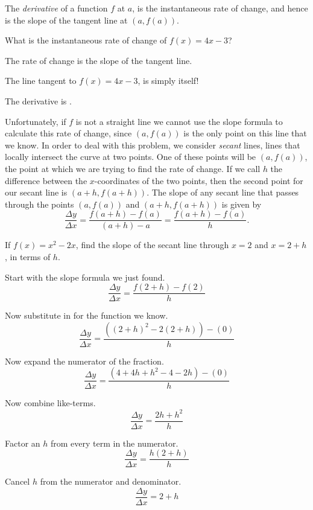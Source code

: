 \documentclass{ximera}
\begin{document}
The \textit{derivative} of a function $f$ at $a$, is the instantaneous
rate of change, and hence is the slope of the tangent line at $(a,f(a))$. 

\begin{question}
	What is the instantaneous rate of change of $f(x) = 4x-3$?
	\begin{hint}
		The rate of change is the slope of the tangent line.
	\end{hint}
	\begin{hint}
		The line tangent to $f(x) = 4x-3$, is simply itself!
	\end{hint}
	\begin{prompt}
		The derivative is .
	\end{prompt}
\end{question}


Unfortunately, if $f$ is not a straight line we cannot use the slope formula to calculate this rate of change, since
$(a,f(a))$ is the only point on this line that we know.  In order to deal with this
problem, we consider \textit{secant} lines, lines that locally intersect the curve at two points.
One of these points will be $(a, f(a))$, the point at which we are trying to find the rate of change.
If we call $h$ the difference between the $x$-coordinates of the two points, then the second point
for our secant line is $(a+h, f(a+h))$.
The slope of any secant line that passes through the points $(a,f(a))$ and $(a+h,
f(a+h))$ is given by
\[
\frac{\Delta y}{\Delta x}=\frac{f(a+h) - f(a)}{(a+h) - a} =
\frac{f(a+h)-f(a)}{h}.
\]

\begin{example}
	If $f(x) = x^2-2x$, find the slope of the secant line through $x=2$ and $x=2+h$, in terms of $h$.
	\begin{explanation}
		Start with the slope formula we just found.
		\[ \frac{\Delta y}{\Delta x} = \frac{f(2+h)-f(2)}{h} \]

		Now substitute in for the function we know.
		\[ \frac{\Delta y}{\Delta x} = \frac{( (2+h)^2-2(2+h) )-(0)}{h} \]

		Now expand the numerator of the fraction.
		\[ \frac{\Delta y}{\Delta x} = \frac{( 4+4h+h^2-4-2h )-(0)}{h} \]
		
		Now combine like-terms.
		\[ \frac{\Delta y}{\Delta x} = \frac{2h+h^2}{h} \]

		Factor an $h$ from every term in the numerator.
		\[ \frac{\Delta y}{\Delta x} = \frac{h(2+h)}{h} \]

		Cancel $h$ from the numerator and denominator.
		\[ \frac{\Delta y}{\Delta x} = 2+h \]
	\end{explanation}
\end{example}
\end{document}
